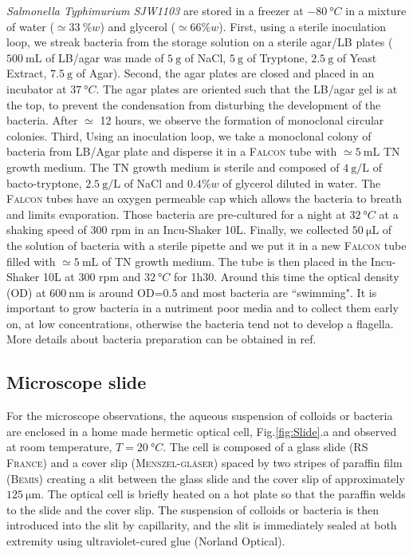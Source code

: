 \documentclass[prb,reprint,amsmath,amssymb]{revtex4-1}
\newcommand{\tg}[1]{{\color{magenta}#1}} %
\begin{document}
\textit{Salmonella Typhimurium SJW1103}  are stored in a freezer at $\SI{-80}{\degree C}$ in a mixture of water ($\simeq \SI{33}{\%} w$) and glycerol ($\simeq 66\% w$). First, using a sterile inoculation loop, we streak bacteria from the storage solution on a sterile agar/LB plates  ($\SI{500}{\milli\liter}$ of LB/agar was made of $\SI{5}{\gram}$ of NaCl, $\SI{5}{\gram}$ of Tryptone, $\SI{2.5}{\gram}$ of Yeast Extract, $\SI{7.5}{\gram}$ of Agar). Second, the agar plates are closed and placed in an incubator at $\SI{37}{\degree C}$. The agar plates are oriented such that the LB/agar gel is at the top, to prevent the condensation from disturbing the development of the bacteria. After $\simeq$ 12 hours, we observe the formation of monoclonal circular colonies. Third, Using an inoculation loop, we take a monoclonal colony of bacteria from LB/Agar plate and disperse it in a \textsc{Falcon} tube with $\simeq \SI{5}{\milli\liter}$ TN growth medium. The TN growth medium is sterile and composed of $\SI{4}{\gram\per\liter}$ of bacto-tryptone, $\SI{2.5}{\gram\per\liter}$ of NaCl and $0.4\% w$ of glycerol diluted in water. The \textsc{Falcon} tubes have an oxygen permeable cap which allows the bacteria to breath and limits evaporation. Those bacteria are pre-cultured for a night at $\SI{32}{\degree C}$ \tg{at a shaking speed of} 300 rpm in an Incu-Shaker 10L. Finally, we collected $\SI{50}{\micro\liter}$ of the solution of bacteria with a sterile pipette and we put it in a new \textsc{Falcon} tube filled with $\simeq \SI{5}{\milli\liter}$ of TN growth medium. The tube is then placed in the Incu-Shaker 10L at 300 rpm and $\SI{32}{\degree C}$ for 1h30. Around this time the optical density (OD) at $\SI{600}{\nano\meter}$ is around OD=0.5 and most bacteria are ``swimming". It is important to grow bacteria in a nutriment poor media and to collect them early on, at low concentrations, otherwise the bacteria tend not to develop a flagella. More details about bacteria preparation can be obtained in ref\cite{Schwarz2015, ajp2010hagen, XXX}.

\subsection{Microscope slide}
For the microscope observations, the aqueous suspension of colloids or bacteria are enclosed in a home made hermetic optical cell, Fig.\ref{fig:Slide}.a and observed at room temperature, $T=\SI{20}{\degree C}$. The cell is composed of a  glass slide (\textsc{RS France}) and a cover slip (\textsc{Menszel-gl\"aser}) spaced by two stripes of paraffin film (\textsc{Bemis}) \tg{creating a slit between the glass slide and the cover slip of approximately $\SI{125}{\micro\meter}$}. The optical cell is briefly heated on a hot plate so that the paraffin welds to the slide and the cover slip. The suspension of colloids or bacteria is then introduced into the slit by capillarity, and the slit is immediately sealed at both extremity using ultraviolet-cured glue (Norland Optical).
\end{document}
